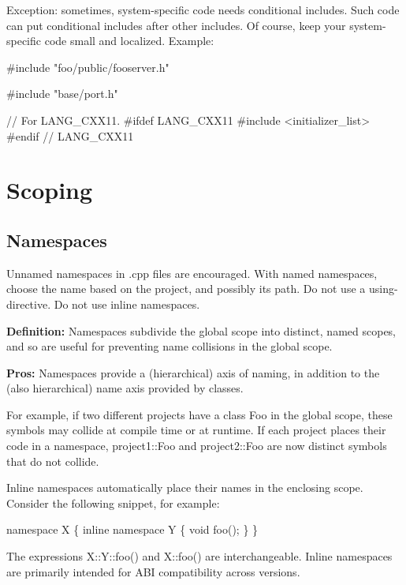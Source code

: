 Exception\+: sometimes, system-\/specific code needs conditional includes. Such code can put conditional includes after other includes. Of course, keep your system-\/specific code small and localized. Example\+:


\begin{DoxyCode}
\textcolor{preprocessor}{#include "foo/public/fooserver.h"}

\textcolor{preprocessor}{#include "base/port.h"} 

\textcolor{comment}{// For LANG\_CXX11.}
\textcolor{preprocessor}{#ifdef LANG\_CXX11}
\textcolor{preprocessor}{#include <initializer\_list>}
\textcolor{preprocessor}{#endif  // LANG\_CXX11}
\end{DoxyCode}


\section*{Scoping}

\subsection*{Namespaces}

Unnamed namespaces in {\ttfamily .cpp} files are encouraged. With named namespaces, choose the name based on the project, and possibly its path. Do not use a using-\/directive. Do not use inline namespaces.

{\bfseries Definition\+:} Namespaces subdivide the global scope into distinct, named scopes, and so are useful for preventing name collisions in the global scope.

{\bfseries Pros\+:} Namespaces provide a (hierarchical) axis of naming, in addition to the (also hierarchical) name axis provided by classes.

For example, if two different projects have a class Foo in the global scope, these symbols may collide at compile time or at runtime. If each project places their code in a namespace, project1\+::\+Foo and project2\+::\+Foo are now distinct symbols that do not collide.

Inline namespaces automatically place their names in the enclosing scope. Consider the following snippet, for example\+:


\begin{DoxyCode}
\textcolor{keyword}{namespace }X \{
\textcolor{keyword}{inline} \textcolor{keyword}{namespace }Y \{
  \textcolor{keywordtype}{void} foo();
\}
\}
\end{DoxyCode}
 The expressions {\ttfamily X\+::\+Y\+::foo()} and {\ttfamily X\+::foo()} are interchangeable. Inline namespaces are primarily intended for A\+BI compatibility across versions.

